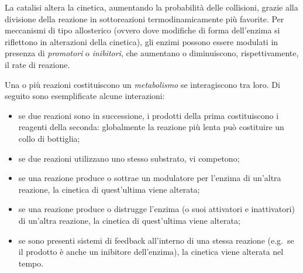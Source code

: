 		La catalisi altera la cinetica, aumentando la probabilit\`a delle collisioni, grazie alla divisione della reazione in sottoreazioni termodinamicamente pi\`u favorite.
		Per meccanismi di tipo allosterico (ovvero dove modifiche di forma dell'enzima si riflettono in alterazioni della cinetica), gli enzimi possono essere modulati in presenza di \emph{promotori} o \emph{inibitori}, che aumentano o diminuiscono, rispettivamente, il rate di reazione.
		
		Una o pi\`u reazioni costituiscono un \emph{metabolismo} se interagiscono tra loro.
		Di seguito sono esemplificate alcune interazioni:
		\begin{itemize}
			\item se due reazioni sono in successione, i prodotti della prima costituiscono i reagenti della seconda: globalmente la reazione pi\`u lenta pu\`o costituire un collo di bottiglia;
			\item se due reazioni utilizzano uno stesso substrato, vi competono;
			\item se una reazione produce o sottrae un modulatore per l'enzima di un'altra reazione, la cinetica di quest'ultima viene alterata;
			\item se una reazione produce o distrugge l'enzima (o suoi attivatori e inattivatori) di un'altra reazione, la cinetica di quest'ultima viene alterata;
			\item se sono presenti sistemi di feedback all'interno di una stessa reazione (e.g.\ se il prodotto \`e anche un inibitore dell'enzima), la cinetica viene alterata nel tempo.
		\end{itemize}
		
